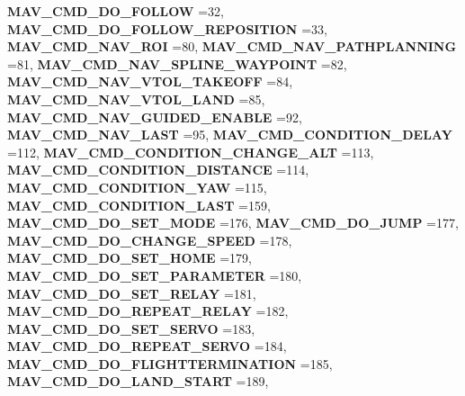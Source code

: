 \begin{DoxyCompactItemize}
\newline
\textbf{ M\+A\+V\+\_\+\+C\+M\+D\+\_\+\+D\+O\+\_\+\+F\+O\+L\+L\+OW} =32, 
\textbf{ M\+A\+V\+\_\+\+C\+M\+D\+\_\+\+D\+O\+\_\+\+F\+O\+L\+L\+O\+W\+\_\+\+R\+E\+P\+O\+S\+I\+T\+I\+ON} =33, 
\textbf{ M\+A\+V\+\_\+\+C\+M\+D\+\_\+\+N\+A\+V\+\_\+\+R\+OI} =80, 
\textbf{ M\+A\+V\+\_\+\+C\+M\+D\+\_\+\+N\+A\+V\+\_\+\+P\+A\+T\+H\+P\+L\+A\+N\+N\+I\+NG} =81, 
\newline
\textbf{ M\+A\+V\+\_\+\+C\+M\+D\+\_\+\+N\+A\+V\+\_\+\+S\+P\+L\+I\+N\+E\+\_\+\+W\+A\+Y\+P\+O\+I\+NT} =82, 
\textbf{ M\+A\+V\+\_\+\+C\+M\+D\+\_\+\+N\+A\+V\+\_\+\+V\+T\+O\+L\+\_\+\+T\+A\+K\+E\+O\+FF} =84, 
\textbf{ M\+A\+V\+\_\+\+C\+M\+D\+\_\+\+N\+A\+V\+\_\+\+V\+T\+O\+L\+\_\+\+L\+A\+ND} =85, 
\textbf{ M\+A\+V\+\_\+\+C\+M\+D\+\_\+\+N\+A\+V\+\_\+\+G\+U\+I\+D\+E\+D\+\_\+\+E\+N\+A\+B\+LE} =92, 
\newline
\textbf{ M\+A\+V\+\_\+\+C\+M\+D\+\_\+\+N\+A\+V\+\_\+\+L\+A\+ST} =95, 
\textbf{ M\+A\+V\+\_\+\+C\+M\+D\+\_\+\+C\+O\+N\+D\+I\+T\+I\+O\+N\+\_\+\+D\+E\+L\+AY} =112, 
\textbf{ M\+A\+V\+\_\+\+C\+M\+D\+\_\+\+C\+O\+N\+D\+I\+T\+I\+O\+N\+\_\+\+C\+H\+A\+N\+G\+E\+\_\+\+A\+LT} =113, 
\textbf{ M\+A\+V\+\_\+\+C\+M\+D\+\_\+\+C\+O\+N\+D\+I\+T\+I\+O\+N\+\_\+\+D\+I\+S\+T\+A\+N\+CE} =114, 
\newline
\textbf{ M\+A\+V\+\_\+\+C\+M\+D\+\_\+\+C\+O\+N\+D\+I\+T\+I\+O\+N\+\_\+\+Y\+AW} =115, 
\textbf{ M\+A\+V\+\_\+\+C\+M\+D\+\_\+\+C\+O\+N\+D\+I\+T\+I\+O\+N\+\_\+\+L\+A\+ST} =159, 
\textbf{ M\+A\+V\+\_\+\+C\+M\+D\+\_\+\+D\+O\+\_\+\+S\+E\+T\+\_\+\+M\+O\+DE} =176, 
\textbf{ M\+A\+V\+\_\+\+C\+M\+D\+\_\+\+D\+O\+\_\+\+J\+U\+MP} =177, 
\newline
\textbf{ M\+A\+V\+\_\+\+C\+M\+D\+\_\+\+D\+O\+\_\+\+C\+H\+A\+N\+G\+E\+\_\+\+S\+P\+E\+ED} =178, 
\textbf{ M\+A\+V\+\_\+\+C\+M\+D\+\_\+\+D\+O\+\_\+\+S\+E\+T\+\_\+\+H\+O\+ME} =179, 
\textbf{ M\+A\+V\+\_\+\+C\+M\+D\+\_\+\+D\+O\+\_\+\+S\+E\+T\+\_\+\+P\+A\+R\+A\+M\+E\+T\+ER} =180, 
\textbf{ M\+A\+V\+\_\+\+C\+M\+D\+\_\+\+D\+O\+\_\+\+S\+E\+T\+\_\+\+R\+E\+L\+AY} =181, 
\newline
\textbf{ M\+A\+V\+\_\+\+C\+M\+D\+\_\+\+D\+O\+\_\+\+R\+E\+P\+E\+A\+T\+\_\+\+R\+E\+L\+AY} =182, 
\textbf{ M\+A\+V\+\_\+\+C\+M\+D\+\_\+\+D\+O\+\_\+\+S\+E\+T\+\_\+\+S\+E\+R\+VO} =183, 
\textbf{ M\+A\+V\+\_\+\+C\+M\+D\+\_\+\+D\+O\+\_\+\+R\+E\+P\+E\+A\+T\+\_\+\+S\+E\+R\+VO} =184, 
\textbf{ M\+A\+V\+\_\+\+C\+M\+D\+\_\+\+D\+O\+\_\+\+F\+L\+I\+G\+H\+T\+T\+E\+R\+M\+I\+N\+A\+T\+I\+ON} =185, 
\newline
\textbf{ M\+A\+V\+\_\+\+C\+M\+D\+\_\+\+D\+O\+\_\+\+L\+A\+N\+D\+\_\+\+S\+T\+A\+RT} =189, 

\end{DoxyCompactItemize}
